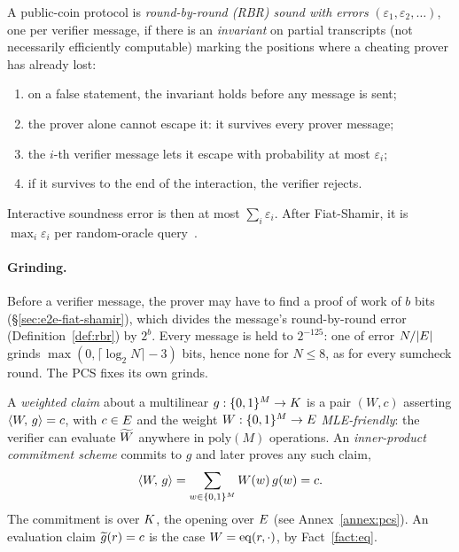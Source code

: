 \begin{definition}\label{def:rbr}
A public-coin protocol is \emph{round-by-round (RBR) sound with errors} $(\varepsilon_1, \varepsilon_2, \dots)$, one per verifier message, if there is an \emph{invariant} on partial transcripts (not necessarily efficiently computable) marking the positions where a cheating prover has already lost:
\begin{enumerate}[itemsep=1pt,label=(\roman*)]
\item on a false statement, the invariant holds before any message is sent;
\item the prover alone cannot escape it: it survives every prover message;
\item the $i$-th verifier message lets it escape with probability at most $\varepsilon_i$;
\item if it survives to the end of the interaction, the verifier rejects.
\end{enumerate}
\end{definition}

Interactive soundness error is then at most $\sum_i \varepsilon_i$. After Fiat-Shamir, it is $\max_i \varepsilon_i$ per random-oracle query~\cite{CCHLRR19,BCS16}.

\paragraph{Grinding.}\label{sec:grinding} Before a verifier message, the prover may have to find a proof of work of $b$ bits (\S\ref{sec:e2e-fiat-shamir}), which divides the message's round-by-round error (Definition~\ref{def:rbr}) by $2^b$. Every message is held to $2^{-125}$: one of error $N/|E|$ grinds $\max(0,\lceil\log_2N\rceil-3)$ bits, hence none for $N\le8$, as for every sumcheck round. The PCS fixes its own grinds.

\begin{definition}\label{def:ipcs}
A \emph{weighted claim} about a multilinear $g:\{0,1\}^{M}\to K$ is a pair $(W,c)$ asserting $\langle W,\, g \rangle=c$, with $c\in E$ and the weight $W:\{0,1\}^{M}\to E$ \emph{MLE-friendly}: the verifier can evaluate $\widetilde{W}$ anywhere in $\mathrm{poly}(M)$ operations. An \emph{inner-product commitment scheme} commits to $g$ and later proves any such claim,
\[
  \langle W,\, g \rangle=\sum_{w\in\{0,1\}^{M}}W(w)\,g(w)=c .
\]
The commitment is over $K$, the opening over $E$ (see Annex~\ref{annex:pcs}). An evaluation claim $\widetilde{g}(r)=c$ is the case $W=\operatorname{eq}(r,\cdot)$, by Fact~\ref{fact:eq}.
\end{definition}
